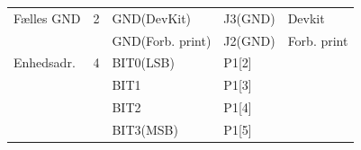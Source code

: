 \begin{table}[H]
\begin{small}
\begin{tabular}{|p{}|p{2cm}|p{}|p{}|p{2.6cm}|}
Fælles GND			&2 						&GND(DevKit)			&J3(GND) 	&Devkit				\\\cline{3-5}							
					& 						&GND(Forb. print)	&J2(GND) 	&Forb. print			\\\hline					
					
Enhedsadr. 			&4 						&BIT0(LSB)			&P1[2]		&					\\\cline{3-4}
					&						&BIT1				&P1[3]		&					\\\cline{3-4}
					&						&BIT2				&P1[4]		&					\\\cline{3-4}
					&						&BIT3(MSB)			&P1[5]		&					\\\hline

\end{tabular}
\end{small}
\label{table:hwforbindelse}
\end{table}